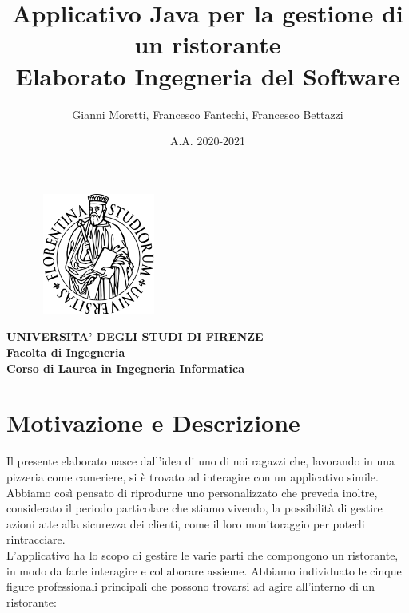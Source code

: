 \documentclass{article}
\title{\LARGE Applicativo Java per la gestione di un ristorante \\
\large Elaborato Ingegneria del Software}
\author{Gianni Moretti, Francesco Fantechi, Francesco Bettazzi}
\date{A.A. 2020-2021}
\begin{document}
\maketitle

\begin{figure}[!h]
\centering
\includegraphics[width=4cm, height=4cm]{"Immagini/LogoUnifi.PNG"}
\end{figure}

\begin{center}
\textbf{\large UNIVERSITA' DEGLI STUDI DI FIRENZE \\
Facolta di Ingegneria \\
\normalsize Corso di Laurea in Ingegneria Informatica}
\end{center}


\newpage

\tableofcontents

\newpage

\section{Motivazione e Descrizione}
Il presente elaborato nasce dall'idea di uno di noi ragazzi che, lavorando in una pizzeria come cameriere, si \`e trovato ad interagire con un applicativo simile. Abbiamo cos\`i pensato di riprodurne uno personalizzato che preveda inoltre, considerato il periodo particolare che stiamo vivendo, la possibilit\`a di gestire azioni atte alla sicurezza dei clienti, come il loro monitoraggio per poterli rintracciare. \\
L'applicativo ha lo scopo di gestire le varie parti che compongono un ristorante, in modo da farle interagire e collaborare assieme. Abbiamo individuato le cinque figure professionali principali che possono trovarsi ad agire all'interno di un ristorante:
\end{document}
